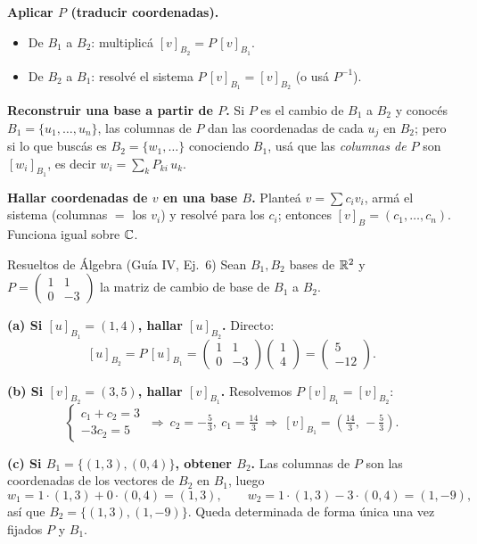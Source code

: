 \begin{receta}
\textbf{Aplicar $P$ (traducir coordenadas).}
\begin{itemize}
\item De $B_1$ a $B_2$: multiplicá $[v]_{B_2}=P\,[v]_{B_1}$.
\item De $B_2$ a $B_1$: resolvé el sistema $P\,[v]_{B_1}=[v]_{B_2}$ (o usá $P^{-1}$).
\end{itemize}
\textbf{Reconstruir una base a partir de $P$.} Si $P$ es el cambio de $B_1$ a $B_2$ y conocés $B_1=\{u_1,\dots,u_n\}$, las columnas de $P$ dan las coordenadas de cada $u_j$ en $B_2$; pero si lo que buscás es $B_2=\{w_1,\dots\}$ conociendo $B_1$, usá que las \emph{columnas de $P$} son $[w_i]_{B_1}$, es decir $w_i=\sum_k P_{ki}\,u_k$.

\smallskip
\textbf{Hallar coordenadas de $v$ en una base $B$.} Planteá $v=\sum c_i v_i$, armá el sistema (columnas $=$ los $v_i$) y resolvé para los $c_i$; entonces $[v]_B=(c_1,\dots,c_n)$. Funciona igual sobre $\mathbb{C}$.
\end{receta}

\begin{ejemplo}{Resueltos de Álgebra (Guía IV, Ej.\ 6)}
Sean $B_1,B_2$ bases de $\mathbb{R}^2$ y $P=\begin{pmatrix}1&1\\0&-3\end{pmatrix}$ la matriz de cambio de base de $B_1$ a $B_2$.

\smallskip
\textbf{(a) Si $[u]_{B_1}=(1,4)$, hallar $[u]_{B_2}$.} Directo:
\[
[u]_{B_2}=P\,[u]_{B_1}=\begin{pmatrix}1&1\\0&-3\end{pmatrix}\begin{pmatrix}1\\4\end{pmatrix}=\begin{pmatrix}5\\-12\end{pmatrix}.
\]

\textbf{(b) Si $[v]_{B_2}=(3,5)$, hallar $[v]_{B_1}$.} Resolvemos $P\,[v]_{B_1}=[v]_{B_2}$:
\[
\begin{cases}c_1+c_2=3\\ -3c_2=5\end{cases}\ \Rightarrow\ c_2=-\tfrac53,\ c_1=\tfrac{14}{3}
\ \Rightarrow\ [v]_{B_1}=\left(\tfrac{14}{3},\,-\tfrac53\right).
\]

\textbf{(c) Si $B_1=\{(1,3),(0,4)\}$, obtener $B_2$.} Las columnas de $P$ son las coordenadas de los vectores de $B_2$ en $B_1$, luego
\[
w_1=1\cdot(1,3)+0\cdot(0,4)=(1,3),\qquad
w_2=1\cdot(1,3)-3\cdot(0,4)=(1,-9),
\]
así que $B_2=\{(1,3),(1,-9)\}$. Queda determinada de forma única una vez fijados $P$ y $B_1$.
\end{ejemplo}

